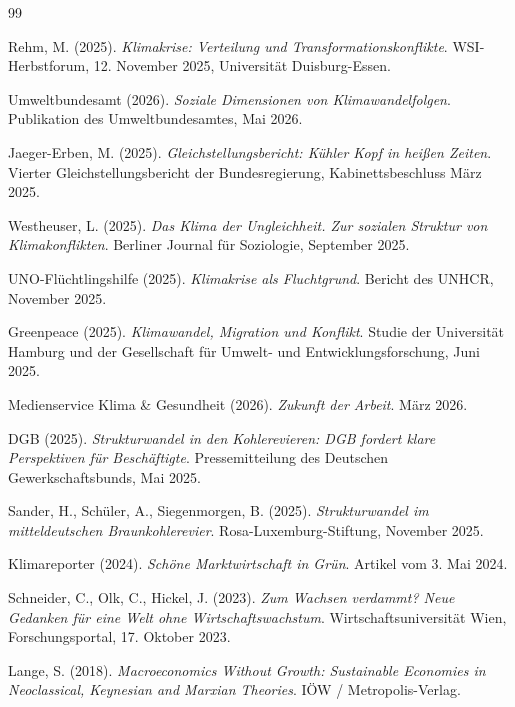 \documentclass[12pt, a4paper]{article}
\begin{document}
	\newpage
	\begin{thebibliography}{99}
		
		Rehm, M. (2025). \textit{Klimakrise: Verteilung und Transformationskonflikte}.
		WSI-Herbstforum, 12. November 2025, Universität Duisburg-Essen.
		
		Umweltbundesamt (2026). \textit{Soziale Dimensionen von Klimawandelfolgen}.
		Publikation des Umweltbundesamtes, Mai 2026.
		
		Jaeger-Erben, M. (2025). \textit{Gleichstellungsbericht: Kühler Kopf in heißen
			Zeiten}. Vierter Gleichstellungsbericht der Bundesregierung, Kabinettsbeschluss
		März 2025.
		
		Westheuser, L. (2025). \textit{Das Klima der Ungleichheit. Zur sozialen Struktur
			von Klimakonflikten}. Berliner Journal für Soziologie, September 2025.
		
		UNO-Flüchtlingshilfe (2025). \textit{Klimakrise als Fluchtgrund}. Bericht des UNHCR,
		November 2025.
		
		Greenpeace (2025). \textit{Klimawandel, Migration und Konflikt}. Studie der
		Universität Hamburg und der Gesellschaft für Umwelt- und Entwicklungsforschung,
		Juni 2025.
		
		Medienservice Klima \& Gesundheit (2026). \textit{Zukunft der Arbeit}.
		März 2026.
		
		DGB (2025). \textit{Strukturwandel in den Kohlerevieren: DGB fordert klare
			Perspektiven für Beschäftigte}. Pressemitteilung des Deutschen Gewerkschaftsbunds,
		Mai 2025.
		
		Sander, H., Schüler, A., Siegenmorgen, B. (2025). \textit{Strukturwandel im
			mitteldeutschen Braunkohlerevier}. Rosa-Luxemburg-Stiftung, November 2025.
		
		Klimareporter (2024). \textit{Schöne Marktwirtschaft in Grün}. Artikel vom 3. Mai
		2024.
		
		Schneider, C., Olk, C., Hickel, J. (2023). \textit{Zum Wachsen verdammt? Neue
			Gedanken für eine Welt ohne Wirtschaftswachstum}. Wirtschaftsuniversität Wien,
		Forschungsportal, 17. Oktober 2023.
		
		Lange, S. (2018). \textit{Macroeconomics Without Growth: Sustainable Economies in
			Neoclassical, Keynesian and Marxian Theories}. IÖW / Metropolis-Verlag.
		

\end{thebibliography}
\end{document}
